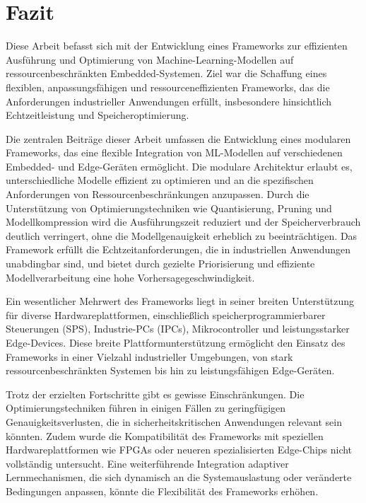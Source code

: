 \chapter{Fazit}
\label{chap:fazit}

Diese Arbeit befasst sich mit der Entwicklung eines Frameworks zur effizienten Ausführung und Optimierung von Machine-Learning-Modellen 
auf ressourcenbeschränkten Embedded-Systemen. Ziel war die Schaffung eines flexiblen, anpassungsfähigen und ressourceneffizienten Frameworks, 
das die Anforderungen industrieller Anwendungen erfüllt, insbesondere hinsichtlich Echtzeitleistung und Speicheroptimierung.

Die zentralen Beiträge dieser Arbeit umfassen die Entwicklung eines modularen Frameworks, das eine flexible Integration von ML-Modellen 
auf verschiedenen Embedded- und Edge-Geräten ermöglicht. Die modulare Architektur erlaubt es, unterschiedliche Modelle effizient zu 
optimieren und an die spezifischen Anforderungen von Ressourcenbeschränkungen anzupassen. Durch die Unterstützung von 
Optimierungstechniken wie Quantisierung, Pruning und Modellkompression wird die Ausführungszeit reduziert und der Speicherverbrauch 
deutlich verringert, ohne die Modellgenauigkeit erheblich zu beeinträchtigen. Das Framework erfüllt die Echtzeitanforderungen, 
die in industriellen Anwendungen unabdingbar sind, und bietet durch gezielte Priorisierung und effiziente Modellverarbeitung eine hohe Vorhersagegeschwindigkeit.

Ein wesentlicher Mehrwert des Frameworks liegt in seiner breiten Unterstützung für diverse Hardwareplattformen, 
einschließlich speicherprogrammierbarer Steuerungen (SPS), Industrie-PCs (IPCs), Mikrocontroller und leistungsstarker Edge-Devices. 
Diese breite Plattformunterstützung ermöglicht den Einsatz des Frameworks in einer Vielzahl industrieller Umgebungen, 
von stark ressourcenbeschränkten Systemen bis hin zu leistungsfähigen Edge-Geräten.

Trotz der erzielten Fortschritte gibt es gewisse Einschränkungen. Die Optimierungstechniken führen in einigen Fällen zu 
geringfügigen Genauigkeitsverlusten, die in sicherheitskritischen Anwendungen relevant sein könnten. Zudem wurde die Kompatibilität 
des Frameworks mit speziellen Hardwareplattformen wie FPGAs oder neueren spezialisierten Edge-Chips nicht vollständig untersucht. 
Eine weiterführende Integration adaptiver Lernmechanismen, die sich dynamisch an die Systemauslastung oder veränderte Bedingungen anpassen, 
könnte die Flexibilität des Frameworks erhöhen.

